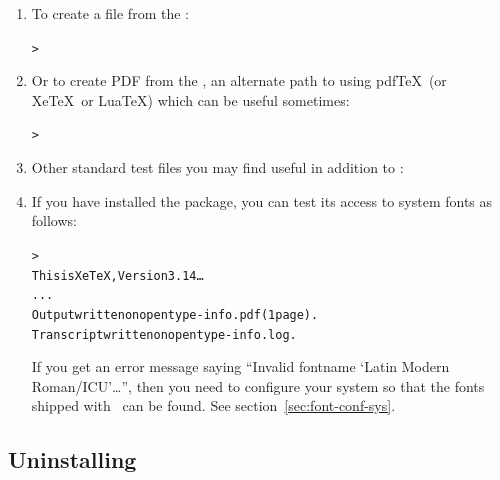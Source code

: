 \documentclass{article}
\begin{document}
\begin{enumerate}
\item To create a \PS{} file from the \dvi:
\begin{alltt}
> 
\end{alltt}

\item Or to create PDF from the \dvi{}, an alternate path to using
pdf\TeX\ (or Xe\TeX\ or Lua\TeX) which can be useful sometimes:
\begin{alltt}
> 
\end{alltt}

\item Other standard test files you may find useful in addition to
:


\item If you have installed the  package, you can test
its access to system fonts as follows:
\begin{alltt}
> 
This is XeTeX, Version 3.14\dots
...
Output written on opentype-info.pdf (1 page).
Transcript written on opentype-info.log.
\end{alltt}

If you get an error message saying ``Invalid fontname `Latin Modern
Roman/ICU'\dots'', then you need to configure your system so that the
fonts shipped with \TL\ can be found.  See
section~\ref{sec:font-conf-sys}.

\end{enumerate}

\subsection{Uninstalling \TL}
\label{sec:uninstall}
\end{document}
